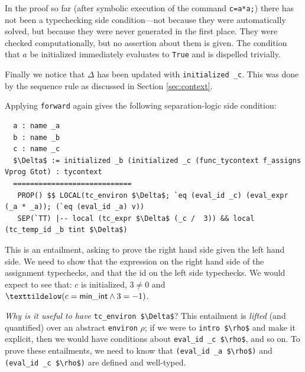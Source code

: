 \documentclass{puthesis}
\begin{document}
In the proof so far (after symbolic execution of the
command \lstinline{c=a*a;})
there has not been a typechecking side condition---not 
because they were automatically
solved, but because they were never generated in the first place. They were checked
computationally, but no assertion about them is given. The condition that $a$ be
initialized immediately evaluates to \lstinline|True| and is dispelled trivially.  

Finally we notice that $\Delta$ has been updated with 
\lstinline|initialized _c|. This was done by the sequence rule as discussed in
Section \ref{sec:context}.

Applying \lstinline|forward| again gives 
the following separation-logic side condition: 

\begin{lstlisting}
  a : name _a
  b : name _b
  c : name _c
  $\Delta$ := initialized _b (initialized _c (func_tycontext f_assigns Vprog Gtot) : tycontext 
  ============================
   PROP() $$ LOCAL(tc_environ $\Delta$; `eq (eval_id _c) (eval_expr (_a * _a)); (`eq (eval_id _a) v)) 
   SEP(`TT) |-- local (tc_expr $\Delta$ (_c /  3)) && local (tc_temp_id _b tint $\Delta$)
\end{lstlisting}
\noindent This is an entailment, asking to prove the right hand side given
the left hand side. We need to show that the expression on the right hand side
of the assignment typechecks, and that the id on the left side typechecks. We
would expect to see that: $c$ is initialized, $3\neq 0$ and
$\texttildelow(c=\mathsf{min\_int} \wedge 3 = -1)$.

\emph{Why is it useful to have} \lstinline{tc_environ $\Delta$}?
This entailment is \emph{lifted} (and quantified) over an abstract
\lstinline|environ| $\rho$; if we were to \lstinline|intro $\rho$| and make it
explicit, then we would have conditions about \lstinline{eval_id _c $\rho$},
and so on.  
To prove these entailments, we need to know that
\lstinline{(eval_id _a $\rho$)}  and 
\lstinline{(eval_id _c $\rho$)}  are defined and well-typed.
\end{document}
